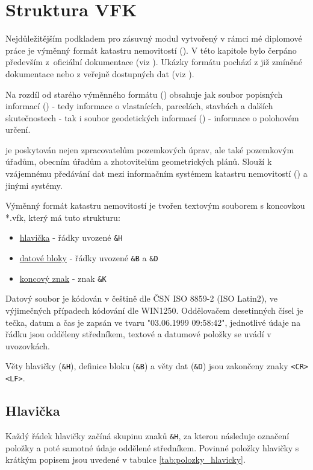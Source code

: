 \chapter{Struktura VFK}
\label{vfk}

Nejdůležitějším podkladem pro zásuvný modul vytvořený v rámci mé diplomové práce je výměnný formát katastru nemovitostí (). V této kapitole bylo čerpáno především z~oficiální dokumentace (viz \citep{struktura_vfk}). Ukázky formátu pochází  z již zmíněné dokumentace nebo z veřejně dostupných dat (viz \citep{zdroj_vfk}).

Na rozdíl od starého výměnného formátu () obsahuje  jak soubor popisných informací () - tedy informace o vlastnících, parcelách, stavbách a dalších skutečnostech - tak i soubor geodetických informací () - informace o polohovém určení.

 je poskytován nejen zpracovatelům pozemkových úprav, ale také pozemkovým úřadům, obecním úřadům a zhotovitelům geometrických plánů. Slouží k vzájemnému předávání dat mezi informačním systémem katastru nemovitostí () a jinými systémy.

Výměnný formát katastru nemovitostí je tvořen textovým souborem s koncovkou *.vfk, který má tuto strukturu:
	\begin{itemize}[leftmargin=1.5cm]
		\item \underline{hlavička} - řádky uvozené \texttt{\&H}
		\item \underline{datové bloky} - řádky uvozené \texttt{\&B} a \texttt{\&D}
		\item \underline{koncový znak} - znak \texttt{\&K}
	\end{itemize}

Datový soubor je kódován v češtině dle ČSN ISO 8859-2 (ISO Latin2), ve výjimečných případech kódování dle
WIN1250. Oddělovačem desetinných čísel je tečka, datum a čas je zapsán ve tvaru "03.06.1999 09:58:42", jednotlivé údaje na řádku jsou odděleny středníkem, textové a datumové položky se uvádí v uvozovkách.

Věty hlavičky (\texttt{\&H}), definice bloku (\texttt{\&B}) a věty dat (\texttt{\&D}) jsou zakončeny znaky \texttt{<CR><LF>}.

\section{Hlavička}
\label{hlavicka}

Každý řádek hlavičky začíná skupinu znaků \texttt{\&H}, za kterou následuje označení položky a poté samotné údaje oddělené středníkem. Povinné položky hlavičky s krátkým popisem jsou uvedené v tabulce \ref{tab:polozky_hlavicky}.

